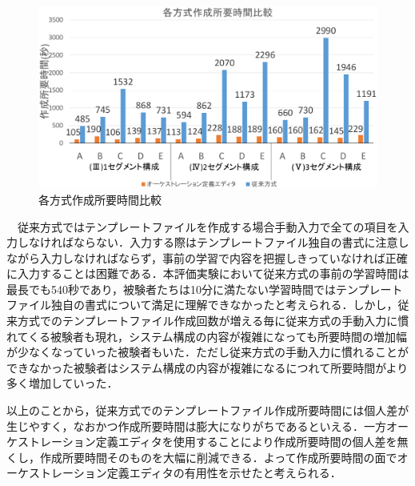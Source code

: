 \documentclass[mingoth]{kut-paper}		%
\begin{document}
\begin{description}
		\begin{figure}[H]
			\begin{center}
				\includegraphics[scale=0.42]{Document/Create_alltime.eps}
				\caption{各方式作成所要時間比較}
				\label{graf:9}
			\end{center}
		\end{figure}
		　従来方式ではテンプレートファイルを作成する場合手動入力で全ての項目を入力しなければならない．入力する際はテンプレートファイル独自の書式に注意しながら入力しなければならず，事前の学習で内容を把握しきっていなければ正確に入力することは困難である．本評価実験において従来方式の事前の学習時間は最長でも540秒であり，被験者たちは10分に満たない学習時間ではテンプレートファイル独自の書式について満足に理解できなかったと考えられる．しかし，従来方式でのテンプレートファイル作成回数が増える毎に従来方式の手動入力に慣れてくる被験者も現れ，システム構成の内容が複雑になっても所要時間の増加幅が少なくなっていった被験者もいた．ただし従来方式の手動入力に慣れることができなかった被験者はシステム構成の内容が複雑になるにつれて所要時間がより多く増加していった．
		
		 以上のことから，従来方式でのテンプレートファイル作成所要時間には個人差が生じやすく，なおかつ作成所要時間は膨大になりがちであるといえる．一方オーケストレーション定義エディタを使用することにより作成所要時間の個人差を無くし，作成所要時間そのものを大幅に削減できる．よって作成所要時間の面でオーケストレーション定義エディタの有用性を示せたと考えられる．
		

\end{description}
\end{document}
